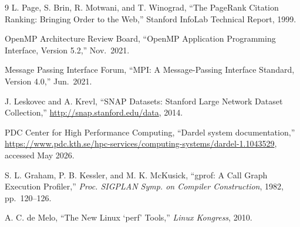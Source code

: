 \documentclass[11pt]{article}
\begin{document}
\begin{thebibliography}{9}
     L. Page, S. Brin, R. Motwani, and T. Winograd,
    ``The PageRank Citation Ranking: Bringing Order to the Web,''
    Stanford InfoLab Technical Report, 1999.

     OpenMP Architecture Review Board, ``OpenMP
    Application Programming Interface, Version 5.2,'' Nov.\ 2021.

     Message Passing Interface Forum, ``MPI: A
    Message-Passing Interface Standard, Version 4.0,'' Jun.\ 2021.

     J. Leskovec and A. Krevl, ``SNAP Datasets: Stanford
    Large Network Dataset Collection,'' \url{http://snap.stanford.edu/data},
    2014.

     PDC Center for High Performance Computing,
    ``Dardel system documentation,''
    \url{https://www.pdc.kth.se/hpc-services/computing-systems/dardel-1.1043529},
    accessed May 2026.

     S. L. Graham, P. B. Kessler, and M. K. McKusick,
    ``gprof: A Call Graph Execution Profiler,'' \emph{Proc. SIGPLAN
    Symp. on Compiler Construction}, 1982, pp.\ 120--126.

     A. C. de Melo, ``The New Linux `perf' Tools,''
    \emph{Linux Kongress}, 2010.
\end{thebibliography}
\end{document}
